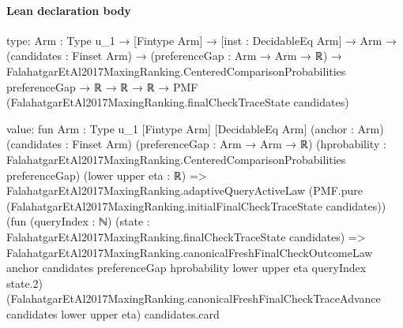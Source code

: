 \documentclass[10pt]{article}
\begin{document}
\paragraph{Lean declaration body}
\begin{ReviewVerbatim}
type:
{Arm : Type u_1} →
  [Fintype Arm] →
    [inst : DecidableEq Arm] →
      Arm →
        (candidates : Finset Arm) →
          (preferenceGap : Arm → Arm → ℝ) →
            FalahatgarEtAl2017MaxingRanking.CenteredComparisonProbabilities preferenceGap →
              ℝ → ℝ → ℝ → PMF (FalahatgarEtAl2017MaxingRanking.finalCheckTraceState candidates)

value:
fun {Arm : Type u_1} [Fintype Arm] [DecidableEq Arm] (anchor : Arm) (candidates : Finset Arm)
    (preferenceGap : Arm → Arm → ℝ)
    (hprobability : FalahatgarEtAl2017MaxingRanking.CenteredComparisonProbabilities preferenceGap)
    (lower upper eta : ℝ) =>
  FalahatgarEtAl2017MaxingRanking.adaptiveQueryActiveLaw
    (PMF.pure (FalahatgarEtAl2017MaxingRanking.initialFinalCheckTraceState candidates))
    (fun (queryIndex : ℕ) (state : FalahatgarEtAl2017MaxingRanking.finalCheckTraceState candidates) =>
      FalahatgarEtAl2017MaxingRanking.canonicalFreshFinalCheckOutcomeLaw anchor candidates preferenceGap hprobability
        lower upper eta queryIndex state.2)
    (FalahatgarEtAl2017MaxingRanking.canonicalFreshFinalCheckTraceAdvance candidates lower upper eta) candidates.card
\end{ReviewVerbatim}
\end{document}
